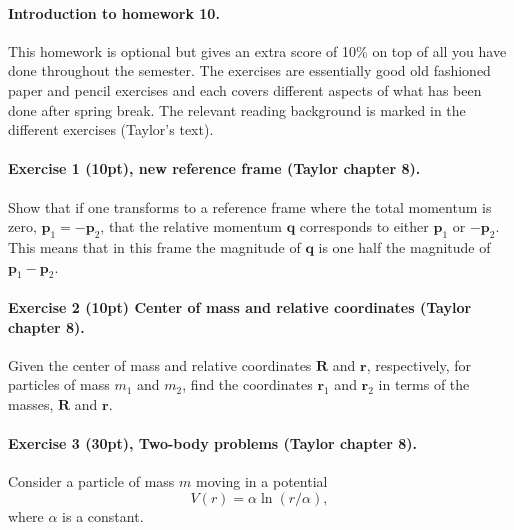\documentclass[%
oneside,                 %
final,                   %
10pt]{article}
\begin{document}
\noindent
\paragraph{Introduction to homework 10.}
This homework is optional but gives an extra score of 10\% on top of
all you have done throughout the semester. The exercises are
essentially good old fashioned paper and pencil exercises and each
covers different aspects of what has been done after spring break.
The relevant reading background is marked in the different exercises (Taylor's text).

\paragraph{Exercise 1 (10pt), new reference frame (Taylor chapter 8).}
Show that if one transforms to a reference frame where the total
momentum is zero, $\bm{p}_1=-\bm{p}_2$, that the relative momentum
$\bm{q}$ corresponds to either $\bm{p}_1$ or $-\bm{p}_2$. This
means that in this frame the magnitude of $\bm{q}$ is one half the
magnitude of $\bm{p}_1-\bm{p}_2$.

\paragraph{Exercise 2 (10pt) Center of mass and relative coordinates (Taylor chapter 8).}
Given the center of mass and relative coordinates $\bm{R}$ and $\bm{r}$, respectively, for
particles of mass $m_1$ and $m_2$, find the coordinates $\bm{r}_1$
and $\bm{r}_2$ in terms of the masses, $\bm{R}$ and $\bm{r}$.


\paragraph{Exercise 3 (30pt),  Two-body problems (Taylor chapter 8).}
Consider a particle of mass $m$ moving in a potential
\[
V(r)=\alpha\ln(r/\alpha),
\]
where $\alpha$ is a constant.
\end{document}
